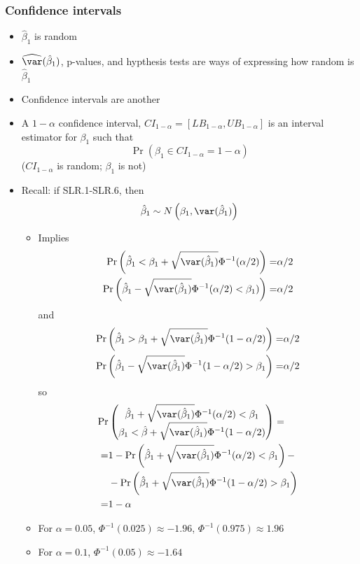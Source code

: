 \begin{frame}[allowframebreaks]\frametitle{Confidence intervals}
  \begin{itemize}
  \item $\hat{\beta}_1$ is random
  \item $\widehat{\var}(\hat{\beta}_1)$, p-values, and hypthesis tests
    are ways of expressing how random is $\hat{\beta}_1$ 
  \item Confidence intervals are another
  \item A $1-\alpha$ confidence interval, $CI_{1-\alpha} =
    [LB_{1-\alpha}, UB_{1-\alpha}]$ is an interval estimator for
    $\beta_1$ such that 
    \[ \Pr(\beta_1 \in CI_{1-\alpha} = 1-\alpha) \]
    ($CI_{1-\alpha}$ is random; $\beta_1$ is not)
  \item Recall: if SLR.1-SLR.6, then 
    \[ \hat{\beta}_1 \sim N\left(\beta_1,\var(\hat{\beta}_1)\right) \]
    \begin{itemize}
    \item Implies
      \begin{align*} 
        \Pr\left(\hat{\beta}_1 < \beta_1 + \sqrt{\var(\hat{\beta}_1)}
          \Phi^{-1}(\alpha/2)\right) = & \alpha/2 \\
        \Pr\left(\hat{\beta}_1 - \sqrt{\var(\hat{\beta}_1)}
          \Phi^{-1}(\alpha/2) < \beta_1)\right) = & \alpha/2 \\
      \end{align*}
      and 
      \begin{align*} 
        \Pr\left(\hat{\beta}_1 > \beta_1 + \sqrt{\var(\hat{\beta}_1)}
          \Phi^{-1}(1-\alpha/2) \right) = & \alpha/2 \\
        \Pr\left(\hat{\beta}_1 - \sqrt{\var(\hat{\beta}_1)}
          \Phi^{-1}(1-\alpha/2) > \beta_1 \right) = & \alpha/2
      \end{align*}
      so 
      \begin{align*}
        \Pr & \begin{pmatrix} \hat{\beta}_1 + \sqrt{\var(\hat{\beta}_1)}
          \Phi^{-1}(\alpha/2) < \beta_1 \\ \beta_1 < \hat{\beta} +
          \sqrt{\var(\hat{\beta}_1)} \Phi^{-1}(1-\alpha/2)
        \end{pmatrix}
        = \\
        = & 1- \Pr\left(\hat{\beta}_1 + \sqrt{\var(\hat{\beta}_1)}
          \Phi^{-1}(\alpha/2) < \beta_1\right) - \\
         & - 
        \Pr\left(\hat{\beta}_1 + \sqrt{\var(\hat{\beta}_1)}
          \Phi^{-1}(1-\alpha/2) > \beta_1\right) \\
        = & 1 - \alpha
      \end{align*}
    \item For $\alpha = 0.05$, $\Phi^{-1}(0.025) \approx -1.96$,
      $\Phi^{-1}(0.975) \approx 1.96$
    \item For $\alpha = 0.1$, $\Phi^{-1}(0.05) \approx -1.64$
    \end{itemize}
  \end{itemize}
\end{frame}

